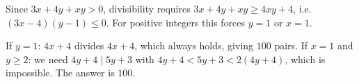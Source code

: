Since $3x+4y+xy>0$, divisibility requires $3x+4y+xy\ge4xy+4$, i.e. $(3x-4)(y-1)\le0$. For positive integers this forces $y=1$ or $x=1$.

If $y=1$: $4x+4$ divides $4x+4$, which always holds, giving $100$ pairs. If $x=1$ and $y\ge2$: we need $4y+4\mid5y+3$ with $4y+4<5y+3<2(4y+4)$, which is impossible. The answer is $\boxed{100}$.
